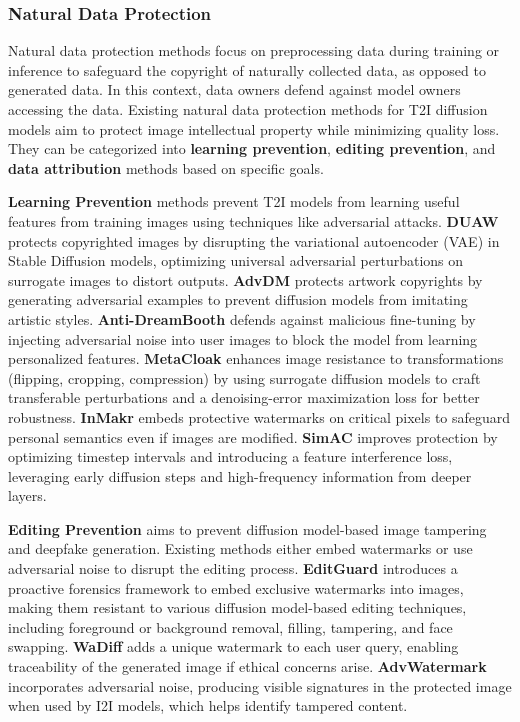 \subsubsection{Natural Data Protection}

Natural data protection methods focus on preprocessing data during training or inference to safeguard the copyright of naturally collected data, as opposed to generated data. In this context, data owners defend against model owners accessing the data. 
Existing natural data protection methods for T2I diffusion models aim to protect image intellectual property while minimizing quality loss. They can be categorized into \textbf{learning prevention}, \textbf{editing prevention}, and \textbf{data attribution} methods based on specific goals.

\textbf{Learning Prevention} methods prevent T2I models from learning useful features from training images using techniques like adversarial attacks. 
\textbf{DUAW} \cite{ye2023duaw} protects copyrighted images by disrupting the variational autoencoder (VAE) in Stable Diffusion models, optimizing universal adversarial perturbations on surrogate images to distort outputs. 
\textbf{AdvDM} \cite{liang2023adversarial} protects artwork copyrights by generating adversarial examples to prevent diffusion models from imitating artistic styles. \textbf{Anti-DreamBooth} \cite{van2023anti} defends against malicious fine-tuning by injecting adversarial noise into user images to block the model from learning personalized features.
\textbf{MetaCloak} \cite{liu2024metacloak} enhances image resistance to transformations (flipping, cropping, compression) by using surrogate diffusion models to craft transferable perturbations and a denoising-error maximization loss for better robustness. \textbf{InMakr} \cite{liu2024countering} embeds protective watermarks on critical pixels to safeguard personal semantics even if images are modified. \textbf{SimAC} \cite{wang2024simac} improves protection by optimizing timestep intervals and introducing a feature interference loss, leveraging early diffusion steps and high-frequency information from deeper layers.


\textbf{Editing Prevention} aims to prevent diffusion model-based image tampering and deepfake generation. Existing methods either embed watermarks or use adversarial noise to disrupt the editing process. \textbf{EditGuard} \cite{zhang2024editguard} introduces a proactive forensics framework to embed exclusive watermarks into images, making them resistant to various diffusion model-based editing techniques, including foreground or background removal, filling, tampering, and face swapping. \textbf{WaDiff} \cite{min2024watermark} adds a unique watermark to each user query, enabling traceability of the generated image if ethical concerns arise. \textbf{AdvWatermark} \cite{zhu2024watermark} incorporates adversarial noise, producing visible signatures in the protected image when used by I2I models, which helps identify tampered content.


